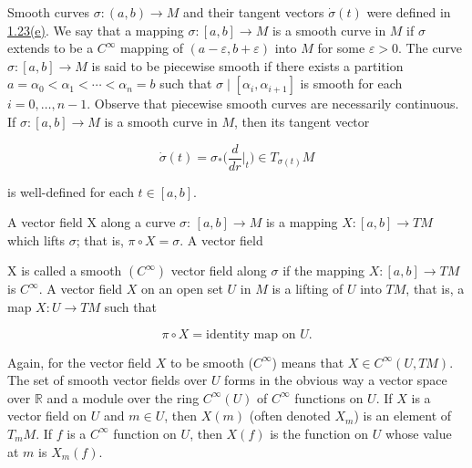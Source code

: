 \begin{definition}\label{thm:1.41}
	Smooth curves $\sigma: (a,b) \to M$ and their tangent vectors $\dot{\sigma}(t)$ were defined in \hyperref[thm:1.23]{1.23(e)}. We say that a mapping $\sigma: [a,b] \to M$ is a smooth curve in $M$ if $\sigma$ extends to be a $C^\infty$ mapping of $(a-\varepsilon, b+\varepsilon)$ into $M$ for some $\varepsilon > 0$. The curve $\sigma: [a,b] \to M$ is said to be piecewise smooth if there exists a partition $a = \alpha_0 < \alpha_1 < \cdots < \alpha_n = b$ such that $\sigma \mid [\alpha_i, \alpha_{i+1}]$ is smooth for each $i = 0, \ldots, n-1$. Observe that piecewise smooth curves are necessarily continuous. If $\sigma: [a,b] \to M$ is a smooth curve in $M$, then its tangent vector 

	\[
		\dot{\sigma}(t)=\sigma_{*}\biggl(\frac{d}{d r}\biggl|_{t}\biggr)\in T_{\sigma(t)} M
	\]

	is well-defined for each  $ t \in [a, b] $.

\end{definition}

\begin{definition}\label{thm:1.42}
	A vector field X along a curve  $ \sigma $:  $ [a,b] \to M $ is a mapping  $ X\colon [a,b] \to TM $ which lifts  $ \sigma $; that is,  $ \pi \circ X = \sigma $. A vector field

	\begin{center}
	\end{center}

	X is called a smooth $(C^{\infty})$ vector field along $\sigma$ if the mapping $X\colon[a,b]\to TM$ is $C^{\infty}$. A vector field $X$ on an open set $U$ in $M$ is a lifting of $U$ into $TM$, that is, a map $X\colon U\to TM$ such that 

	\[
		\pi\circ X=\text{identity map on }U.
	\]

	Again, for the vector field $X$ to be smooth ($C^\infty$) means that $X \in C^\infty(U, TM)$. The set of smooth vector fields over $U$ forms in the obvious way a vector space over $\mathbb{R}$ and a module over the ring $C^\infty(U)$ of $C^\infty$ functions on $U$. If $X$ is a vector field on $U$ and $m \in U$, then $X(m)$ (often denoted $X_m$) is an element of $T_{m} M$. If $f$ is a $C^\infty$ function on $U$, then $X(f)$ is the function on $U$ whose value at $m$ is $X_m(f)$.

\end{definition}


